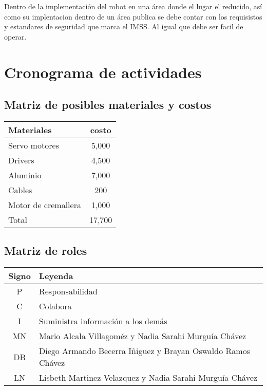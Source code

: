 \documentclass[letter,operight,12pt,spanish]{report}
\begin{document}
Dentro de la implementaci\'on del robot en una \'area donde el lugar el reducido, as\'i como su implentacion dentro de un \'area publica se debe contar con los requisistos y estandares de seguridad que marca el IMSS. Al igual que debe ser facil de operar.
\section{Cronograma de actividades}

\subsection{Matriz de posibles materiales y costos}

\begin{center}
\begin{tabular}{|l|c|}
\hline
	\textbf{Materiales} & \textbf{costo}\\
\hline
	Servo motores & 5,000\\
\hline
	Drivers & 4,500\\
\hline
	Aluminio & 7,000\\
\hline
	Cables & 200\\
\hline
	Motor de cremallera & 1,000\\
\hline
	Total & 17,700\\
\hline
\end{tabular}
\end{center}

\subsection{Matriz de roles}

\begin{center}
\begin{tabular}{|c|l|}
\hline
	\textbf{Signo} & \textbf{Leyenda}\\
\hline
	P & Responsabilidad\\
\hline
	C & Colabora\\
\hline
	I & Suministra informaci\'on a los dem\'as\\
\hline
	MN & Mario Alcala Villagom\'ez y Nadia Sarahi Murgu\'ia Ch\'avez\\
\hline
	DB & Diego Armando Becerra Iñiguez y Brayan Oswaldo Ramos Ch\'avez\\
\hline
	LN & Lisbeth Martinez Velazquez y Nadia Sarahi Murgu\'ia Ch\'avez\\
\hline
\end{tabular}
\end{center}
\end{document}
